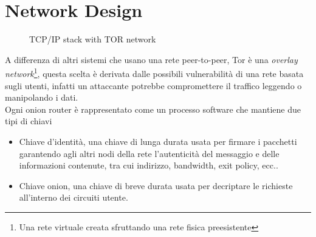 \newpage


\section{Network Design}
\begin{wrapfigure}{1}{0.5\textwidth}
    \centering
    
    \caption{TCP/IP stack with TOR network}
    \label{fig:overlayNetwork}
\end{wrapfigure}

A differenza di altri sistemi che usano una rete peer-to-peer, Tor è una \emph{overlay network}\footnote{Una rete virtuale creata sfruttando una rete fisica preesistente}, questa scelta è derivata dalle possibili vulnerabilità di una rete basata sugli utenti, infatti un attaccante potrebbe compromettere il traffico leggendo o manipolando i dati. \\
Ogni onion router è rappresentato come un processo software che mantiene due tipi di chiavi
\begin{itemize}
    \item Chiave d'identità, una chiave di lunga durata usata per firmare i pacchetti garantendo agli altri nodi della rete l'autenticità del messaggio e delle informazioni contenute, tra cui indirizzo, bandwidth, exit policy, ecc..
    \item Chiave onion, una chiave di breve durata usata per decriptare le richieste all'interno dei circuiti utente.
\end{itemize}

